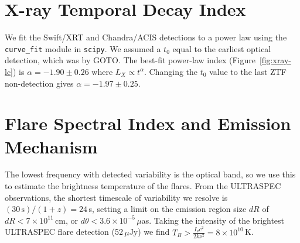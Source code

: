 \documentclass{nature_plusfigure}
\begin{document}
\begin{methods}

\section{X-ray Temporal Decay Index}
\label{sec:xray-decay-index}

We fit the Swift/XRT and Chandra/ACIS detections to a power law using the \texttt{curve\_fit} module in \texttt{scipy}. We assumed a $t_0$ equal to the earliest optical detection, which was by GOTO\cite{Coppejans2022}. The best-fit power-law index (Figure~\ref{fig:xray-lc}) is $\alpha=-1.90\pm0.26$ where $L_X \propto t^{\alpha}$.
Changing the $t_0$ value to the last ZTF non-detection gives $\alpha=-1.97\pm0.25$.



\section{Flare Spectral Index and Emission Mechanism}
\label{sec:flare-emission-mechanism}

The lowest frequency with detected variability is the optical band, so we use this to estimate the brightness temperature of the flares.
From the ULTRASPEC observations, the shortest timescale of variability we resolve is $(30\,\mathrm{s})/(1+z) = 24\,$s, setting a limit on the emission region size $dR$ of $dR<7\times10^{11}\,$cm, or $d\theta < 3.6 \times 10^{-5}\,\mu$as. Taking the intensity of the brightest ULTRASPEC flare detection (52\,$\mu$Jy) we find $T_B > \frac{I_\nu c^2}{2 k\nu^2} = 8\times10^{10}\,$K.


\end{methods}
\end{document}
